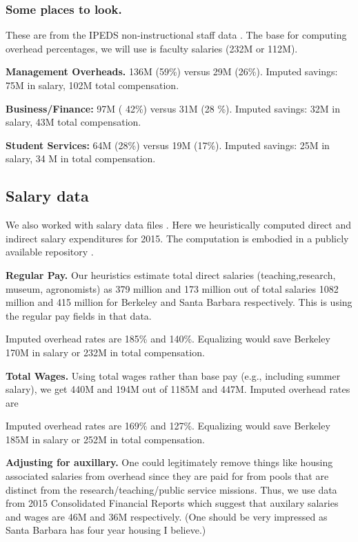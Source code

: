 \documentclass{article}
\begin{document}
\subsubsection{Some places to look.}

These are from the IPEDS non-instructional staff data
\cite{ipeds-nis}.  The base for computing overhead percentages, we
will use is faculty salaries (232M or 112M).

{\bf Management Overheads.} 136M (59\%) versus 29M (26\%). Imputed
savings: 75M in salary, 102M total compensation.

{\bf Business/Finance:} 97M ( 42\%) versus 31M (28 \%). Imputed savings:
32M in salary, 43M total compensation.

{\bf Student Services:} 64M (28\%) versus 19M (17\%). Imputed savings:
25M in salary,  34 M in total compensation.

\subsection{Salary data}

We also worked with salary data files \cite{salary,ucpay}.
Here we heuristically computed direct and indirect
salary expenditures for 2015. The computation is embodied in a
publicly available repository \cite{github-link}.


{\bf Regular Pay.}  Our heuristics estimate total direct salaries
(teaching,research, museum, agronomists) as 379 million and 173
million out of total salaries 1082 million and 415 million for
Berkeley and Santa Barbara respectively.  This is using the regular
pay fields in that data.

Imputed overhead rates are 185\% and 140\%.  Equalizing
would save Berkeley 170M in salary or 232M in total
compensation. 

{\bf Total Wages.} Using total wages rather than base pay
(e.g., including summer salary), we get 440M and 194M
out of 1185M and 447M.  Imputed overhead rates are 

Imputed overhead rates are 169\% and 127\%.  Equalizing
would save Berkeley 185M in salary or 252M in total
compensation. 

{\bf Adjusting for auxillary.} One could legitimately
remove things like housing associated salaries from overhead since
they are paid for from pools that are distinct
from the research/teaching/public service missions.
Thus, we use data from 2015 Consolidated Financial
Reports \cite{UCSB-consolidated,UCB-consolidated}
which suggest that auxilary salaries and wages
are 46M and 36M respectively. (One should be very
impressed as Santa Barbara has four year housing
I believe.)
\end{document}
